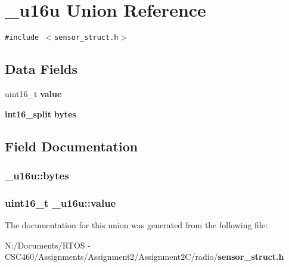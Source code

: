 \section{\_\-u16u Union Reference}
\label{union__u16u}
{\tt \#include $<$sensor\_\-struct.h$>$}

\subsection*{Data Fields}
\begin{CompactItemize}
\item 
uint16\_\-t {\bf value}
\item 
{\bf int16\_\-split} {\bf bytes}
\end{CompactItemize}


\subsection{Field Documentation}
\subsubsection{ {\bf \_\-u16u::bytes}}\label{union__u16u_d140855ebeac63d624be5b2e408ca554}


\subsubsection{\setlength{\rightskip}{0pt plus 5cm}uint16\_\-t {\bf \_\-u16u::value}}\label{union__u16u_9b44a62cf17efb5cb5fec102d4abcdf3}




The documentation for this union was generated from the following file:\begin{CompactItemize}
\item 
N:/Documents/RTOS - CSC460/Assignments/Assignment2/Assignment2C/radio/{\bf sensor\_\-struct.h}\end{CompactItemize}
